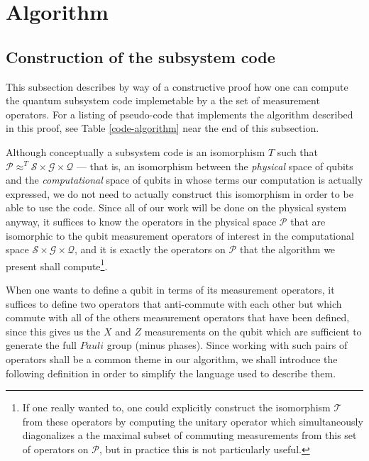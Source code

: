 \documentclass[twocolumn,showpacs,preprintnumbers,amsmath,amssymb,nofootinbib,pra,floatfix]{revtex4}
\newenvironment{remark}[1][Remark]{\begin{trivlist}
\item[\hskip \labelsep {\bfseries #1}]}{\end{trivlist}}
\begin{document}
\section{Algorithm}

\subsection{Construction of the subsystem code}

\begin{remark}
This subsection describes by way of a constructive proof how one can compute the quantum subsystem code implemetable by a the set of measurement operators.  For a listing of pseudo-code that implements the algorithm described in this proof, see Table \ref{code-algorithm} near the end of this subsection.
\end{remark}
Although conceptually a subsystem code is an isomorphism $T$ such that  $\mathscr{P}\approx^T \mathscr{S}\times\mathscr{G}\times\mathscr{Q}$ --- that is, an isomorphism between the \emph{physical} space of qubits and the \emph{computational} space of qubits in whose terms our computation is actually expressed, we do not need to actually construct this isomorphism in order to be able to use the code.  Since all of our work will be done on the physical system anyway, it suffices to know the operators in the physical space $\mathscr{P}$ that are isomorphic to the qubit measurement operators of interest in the computational space $\mathscr{S}\times\mathscr{G}\times\mathscr{Q}$, and it is exactly the operators on $\mathscr{P}$ that the algorithm we present shall compute\footnote{If one really wanted to, one could explicitly construct the isomorphism $\mathscr{T}$ from these operators by computing the unitary operator which simultaneously diagonalizes a the maximal subset of commuting measurements from this set of operators on $\mathscr{P}$, but in practice this is not particularly useful.}.

When one wants to define a qubit in terms of its measurement operators, it suffices to define two operators that anti-commute with each other but which commute with all of the others measurement operators that have been defined, since this gives us the $X$ and $Z$ measurements on the qubit which are sufficient to generate the full $Pauli$ group (minus phases).  Since working with such pairs of operators shall be a common theme in our algorithm, we shall introduce the following definition in order to simplify the language used to describe them.
\end{document}
